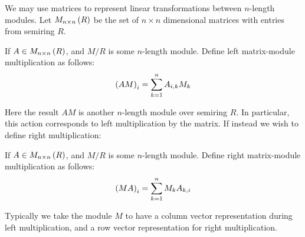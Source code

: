 We may use matrices to represent linear transformations
between \(n\)-length modules.
Let \(M_{n \times n} \left(R\right)\)
be the set of \(n \times n\) dimensional
matrices with entries from semiring \(R\).

\begin{definition}
If \(A \in M_{n \times n}\left(R\right)\),
and \(M / R\) is some \(n\)-length module.
Define left matrix-module multiplication as follows:
\begin{align*}
  \left(AM\right)_{i}
    = \sum_{k = 1}^{n} A_{i, k} M_k
\end{align*}
\end{definition}

Here the result \(AM\) is another \(n\)-length module over semiring \(R\).
In particular, this action corresponds to left multiplication by the matrix.
If instead we wish to define right multiplication:

\begin{definition}
If \(A \in M_{n \times n}\left(R\right)\),
and \(M / R\) is some \(n\)-length module.
Define right matrix-module multiplication as follows:
\begin{align*}
  \left(MA\right)_{i}
    = \sum_{k = 1}^{n} M_k A_{k, i}
\end{align*}
\end{definition}

Typically we take the module \(M\) to have a column vector representation
during left multiplication,
and a row vector representation for right multiplication.


